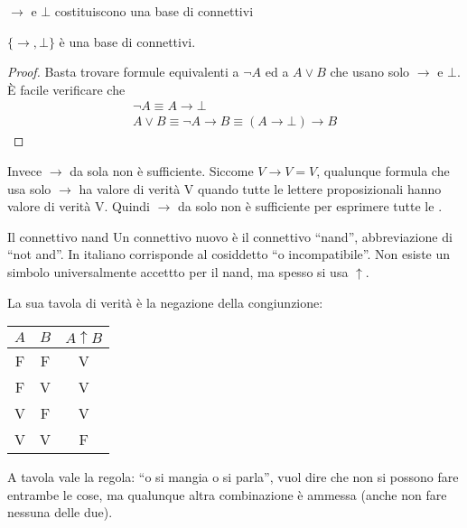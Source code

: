 \documentclass[aspectratio=169,10pt,dvipsnames,xcolor=table,handout]{beamer}
\begin{document}
\begin{frame}{$\to$ e $\bot$ costituiscono una base di connettivi}
    \begin{theorem}
        $\{ \to, \bot\}$ è una base di connettivi.
    \end{theorem}
    \begin{proof}
    Basta trovare formule equivalenti a $\neg A$ ed a $A \vee B$ che usano solo $\to$ e $\bot$. È facile verificare che
    \begin{gather*}
        \neg A \equiv A \to \bot\\
        A \vee B \equiv \neg A \to B \equiv (A \to \bot) \to B
    \end{gather*}
    \end{proof}

    Invece $\to$ da sola non è sufficiente. Siccome $V \to V = V$, qualunque formula che usa solo $\to$ ha valore di verità V quando tutte le lettere proposizionali hanno valore di verità V. Quindi $\to$ da solo non è sufficiente per esprimere tutte le \fp.
\end{frame}

\begin{frame}{Il connettivo nand}
    Un connettivo nuovo è il connettivo ``\alert{nand}'', abbreviazione di ``not and''. In italiano corrisponde al cosiddetto ``\alert{o incompatibile}''. Non esiste un simbolo universalmente accettto per il nand, ma spesso si usa $\uparrow$.

    \medskip
    La sua tavola di verità è la negazione della congiunzione:
    \begin{center}
        \begin{tabular}{c|c||c}
            $A$ & $B$ & $A \uparrow B$ \\
            \hline
            F   & F   & V         \\
            F   & V   & V         \\
            V   & F   & V         \\
            V   & V   & F
        \end{tabular}
    \end{center}

    \begin{example}
        A tavola vale la regola: ``o si mangia o si parla'', vuol dire che non si possono fare entrambe le cose, ma qualunque altra combinazione è ammessa (anche non fare nessuna delle due).
    \end{example}
\end{frame}
\end{document}
